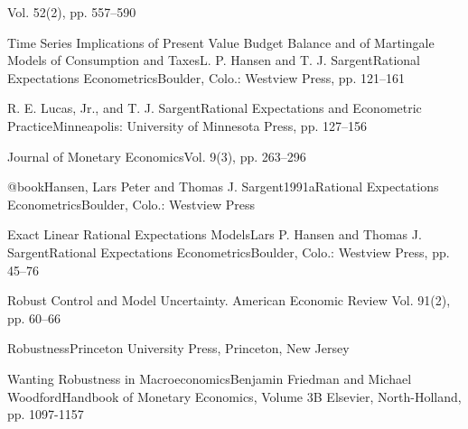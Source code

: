 { 
 {Vol. 52(2), pp. 557--590}


{Time Series Implications of Present Value Budget Balance and of Martingale Models
of Consumption and Taxes}{L. P. Hansen and T. J. Sargent}{Rational Expectations
Econometrics}{Boulder, Colo.: Westview Press, pp. 121--161}



 {R. E. Lucas, Jr., and T. J. Sargent}{Rational Expectations and Econometric
 Practice}{Minneapolis: University of Minnesota Press, pp. 127--156}


 {Journal of Monetary Economics}{Vol. 9(3), pp. 263--296}

@book{Hansen, Lars Peter  and Thomas  J. Sargent}{1991a}{Rational Expectations
Econometrics}{Boulder, Colo.: Westview Press}


 {Exact
Linear Rational Expectations Models}{Lars P. Hansen and Thomas J.
Sargent}{Rational Expectations Econometrics}{Boulder, Colo.: Westview
Press, pp. 45--76}


 {Robust Control and
Model Uncertainty.} {American Economic Review} {Vol. 91(2), pp.
60--66}


{Robustness}{Princeton University Press, Princeton, New Jersey}

 {Wanting Robustness in Macroeconomics}{Benjamin Friedman and Michael Woodford}{Handbook of Monetary Economics, Volume 3B}
{Elsevier, North-Holland, pp.
1097-1157}

}
